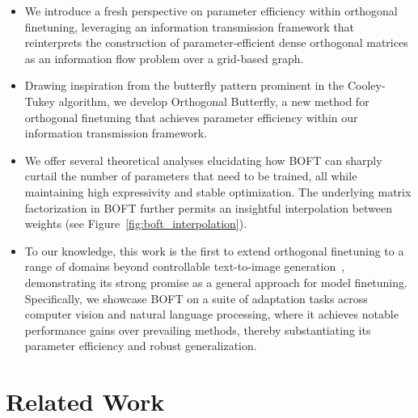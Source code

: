 \begin{itemize}[leftmargin=*,nosep]
    \item We introduce a fresh perspective on parameter efficiency within orthogonal finetuning, leveraging an information transmission framework that reinterprets the construction of parameter-efficient dense orthogonal matrices as an information flow problem over a grid-based graph.
    \item Drawing inspiration from the butterfly pattern prominent in the Cooley-Tukey algorithm, we develop Orthogonal Butterfly, a new method for orthogonal finetuning that achieves parameter efficiency within our information transmission framework.
    \item We offer several theoretical analyses elucidating how BOFT can sharply curtail the number of parameters that need to be trained, all while maintaining high expressivity and stable optimization. The underlying matrix factorization in BOFT further permits an insightful interpolation between weights (see Figure~\ref{fig:boft_interpolation}).
    \item To our knowledge, this work is the first to extend orthogonal finetuning to a range of domains beyond controllable text-to-image generation~\cite{qiu2023controlling}, demonstrating its strong promise as a general approach for model finetuning. Specifically, we showcase BOFT on a suite of adaptation tasks across computer vision and natural language processing, where it achieves notable performance gains over prevailing methods, thereby substantiating its parameter efficiency and robust generalization.
\end{itemize}

\section{Related Work}

